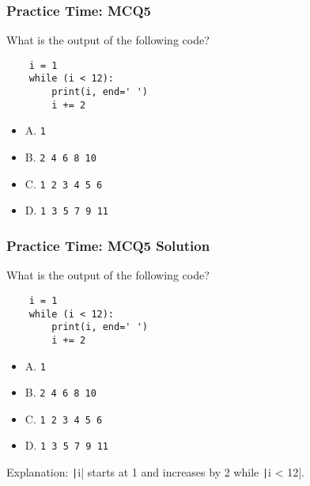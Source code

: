 \documentclass{beamer}
\begin{document}
\begin{frame}[fragile]
    \frametitle{Practice Time: MCQ5}
    What is the output of the following code?
    \begin{verbatim}
    i = 1
    while (i < 12):
        print(i, end=' ')
        i += 2
    \end{verbatim}
    \begin{itemize}
        \item A. \texttt{1}
        \item B. \texttt{2 4 6 8 10}
        \item C. \texttt{1 2 3 4 5 6}
        \item D. \texttt{1 3 5 7 9 11}
    \end{itemize}
\end{frame}
\begin{frame}[fragile]
    \frametitle{Practice Time: MCQ5 Solution}
    What is the output of the following code?
    \begin{verbatim}
    i = 1
    while (i < 12):
        print(i, end=' ')
        i += 2
    \end{verbatim}
    \begin{itemize}
        \item A. \texttt{1}
        \item B. \texttt{2 4 6 8 10}
        \item C. \texttt{1 2 3 4 5 6}
        \item \alert{D. \texttt{1 3 5 7 9 11}}
    \end{itemize}

    Explanation: \texttt|i| starts at 1 and increases by 2 while \texttt|i < 12|.
\end{frame}
\end{document}
